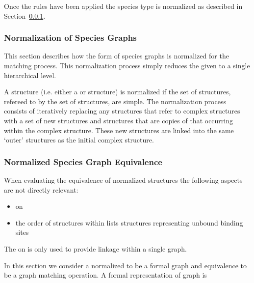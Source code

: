 \documentclass{cekarticle}
\begin{document}
Once the rules have been applied the species type is normalized as
described in Section~\ref{sec:norm-graphs}.

\subsubsection{Normalization of Species Graphs}
\label{sec:norm-graphs}

This section describes how the form of species graphs is
normalized for the matching process.  This normalization process
simply reduces the given  to a single
hierarchical level.

A  structure (i.e. either a
 or  structure)
is normalized if the set of  structures,
refereed to by the set of  structures,
are simple. The normalization process consists of iteratively
replacing any  structures that refer to
complex  structures with a set of new
 structures and 
structures that are copies of that occurring within the complex
 structure.  These new structures are linked
into the same `outer'  structures as the initial
complex  structure.

\subsubsection{Normalized Species Graph Equivalence}
\label{sec:match-graphs}

When evaluating the equivalence of normalized 
structures the following aspects are not directly relevant:
\begin{itemize}
\item {} on 

\item the order of structures within lists 
structures representing unbound binding sites
\end{itemize}

The  on  is only used to provide linkage within a single
graph.

In this section we consider a normalized  to
be a formal graph and equivalence to be a graph matching
operation. A formal representation of graph is
\end{document}
